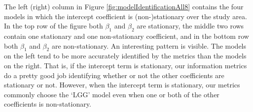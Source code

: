 \documentclass{article}\usepackage[]{graphicx}\usepackage[]{color}
\begin{document}
The left (right) column in Figure \ref{fig:modelIdentificationAll8} contains the four models in which the intercept coefficient is (non-)stationary over the study area. In the top row of the figure both $\beta _1$ and $\beta _2$ are stationary, the middle two rows contain one stationary and one non-stationary coefficient, and in the bottom row both $\beta _1$ and $\beta _2$ are non-stationary. An interesting pattern is visible. The models on the left tend to be more accurately identified by the metrics than the models on the right. That is, if the intercept term is stationary, our information metrics do a pretty good job identifying whether or not the other coefficients are stationary or not. However, when the intercept term is stationary, our metrics commonly choose the `LGG' model even when one or both of the other coefficients is non-stationary. 






% 
\end{document}
